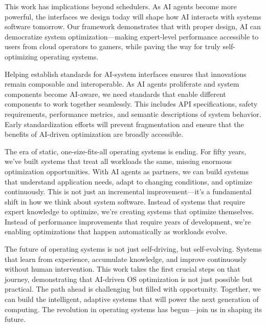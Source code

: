 This work has implications beyond schedulers. As AI agents become more powerful, the interfaces we design today will shape how AI interacts with systems software tomorrow. Our framework demonstrates that with proper design, AI can democratize system optimization—making expert-level performance accessible to users from cloud operators to gamers, while paving the way for truly self-optimizing operating systems.

Helping establish standards for AI-system interfaces ensures that innovations remain composable and interoperable. As AI agents proliferate and system components become AI-aware, we need standards that enable different components to work together seamlessly. This includes API specifications, safety requirements, performance metrics, and semantic descriptions of system behavior. Early standardization efforts will prevent fragmentation and ensure that the benefits of AI-driven optimization are broadly accessible.

The era of static, one-size-fits-all operating systems is ending. For fifty years, we've built systems that treat all workloads the same, missing enormous optimization opportunities. With AI agents as partners, we can build systems that understand application needs, adapt to changing conditions, and optimize continuously. This is not just an incremental improvement—it's a fundamental shift in how we think about system software. Instead of systems that require expert knowledge to optimize, we're creating systems that optimize themselves. Instead of performance improvements that require years of development, we're enabling optimizations that happen automatically as workloads evolve.

The future of operating systems is not just self-driving, but self-evolving. Systems that learn from experience, accumulate knowledge, and improve continuously without human intervention. This work takes the first crucial steps on that journey, demonstrating that AI-driven OS optimization is not just possible but practical. The path ahead is challenging but filled with opportunity. Together, we can build the intelligent, adaptive systems that will power the next generation of computing. The revolution in operating systems has begun—join us in shaping its future.